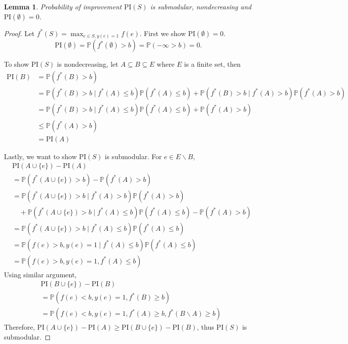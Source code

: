 \documentclass[11pt]{article}
\newcommand{\Prob}{\mathbb{P}}
\newcommand{\PI}{\text{PI}}
\newtheorem{lemma}{Lemma}
\begin{document}
\begin{lemma} 
  Probability of improvement $\PI(S)$ is submodular, nondecreasing and $\PI(\emptyset)=0$.
\end{lemma}
\begin{proof}
Let $f^*(S) = \max_{e \in S, y(e)=1} f(e)$. First we show $\PI(\emptyset) = 0$.
\begin{equation*}
  \PI(\emptyset) = \Prob(f^*(\emptyset) > b) = \Prob(-\infty > b)=0.
\end{equation*}

To show $\PI(S)$ is nondecreasing, let $A \subseteq B \subseteq E$ where $E$ is a finite set, then
\begin{equation*}
\begin{split}
\PI(B) &= \Prob(f^*(B) > b) \\
       &= \Prob(f^*(B) > b \mid f^*(A) \leq b) \Prob(f^*(A) \leq b) + \Prob(f^*(B) > b \mid f^*(A) > b) \Prob(f^*(A) > b) \\
       &= \Prob(f^*(B) > b \mid f^*(A) \leq b) \Prob(f^*(A) \leq b) + \Prob(f^*(A) > b) \\
       &\leq \Prob(f^*(A) > b) \\
       &= \PI(A)
\end{split}
\end{equation*}

Lastly, we want to show $\PI(S)$ is submodular. For $e \in E\backslash B$,
\begin{equation*}
  \begin{split}
    &\PI(A \cup \{e\}) - \PI(A) \\
    &= \Prob(f^*(A \cup \{e\}) > b) - \Prob(f^*(A) > b) \\
    &= \Prob(f^*(A \cup \{e\}) > b \mid f^*(A) > b) \Prob(f^*(A) > b) \\
    &\quad + \Prob(f^*(A \cup \{e\}) > b \mid f^*(A) \leq b)
    \Prob(f^*(A) \leq b) - \Prob(f^*(A) > b) \\
    &= \Prob(f^*(A \cup \{e\}) > b \mid f^*(A)\leq b) \Prob(f^*(A)\leq b) \\
    &= \Prob(f(e) > b, y(e) = 1 \mid f^*(A) \leq b) \Prob(f^*(A) \leq b) \\
    &= \Prob(f(e) > b, y(e) = 1, f^*(A) \leq b)
  \end{split}
\end{equation*}
Using similar argument,
\begin{equation*}
\begin{split}
&\PI(B \cup \{e\}) - \PI(B) \\
&= \Prob(f(e)<b, y(e)=1,f^*(B)\geq b) \\
&= \Prob(f(e)<b, y(e)=1,f^*(A)\geq b, f^*(B\backslash A) \geq b )
\end{split}
\end{equation*}
Therefore, $\PI(A \cup \{e\}) - \PI(A) \geq \PI(B \cup \{e\}) - \PI(B)$, thus $\PI(S)$ is submodular. \qedhere
\end{proof}
\end{document}
